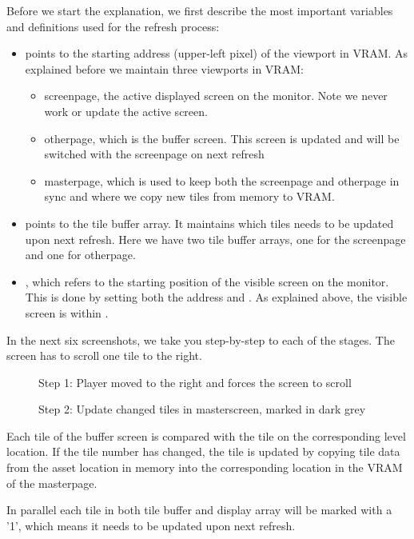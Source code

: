 \documentclass[book.tex]{subfiles}
\begin{document}
Before we start the explanation, we first describe the most important variables and definitions used for the refresh process:
\begin{itemize}
  \item {} points to the starting address (upper-left pixel) of the viewport in VRAM. As explained before we maintain three viewports in VRAM:
  \begin{itemize}
    \item screenpage, the active displayed screen on the monitor. Note we never work or update the active screen.
    \item otherpage, which is the buffer screen. This screen is updated and will be switched with the screenpage on next refresh
    \item masterpage, which is used to keep both the screenpage and otherpage in sync and where we copy new tiles from memory to VRAM.
  \end{itemize}
  \item {} points to the tile buffer array. It maintains which tiles needs to be updated upon next refresh. Here we have two tile buffer arrays, one for the screenpage and one for otherpage.
  \item {}, which refers to the starting position of the visible screen on the monitor. This is done by setting both the  address and . As explained above, the visible screen is within . 
\end{itemize}

In the next six screenshots, we take you step-by-step to each of the stages. The screen has to scroll one tile to the right. \\

\begin{figure}[H]
\centering
 \caption{Step 1: Player moved to the right and forces the screen to scroll}
 \label{fig:kc1_3_start}
\end{figure}

\begin{figure}[H]
\centering
 \caption{Step 2: Update changed tiles in masterscreen, marked in dark grey}
 \label{fig:kc1_3_update_masterscreen}
\end{figure}

Each tile of the buffer screen is compared with the tile on the corresponding level location. If the tile number has changed, the tile is updated by copying tile data from the asset location in memory into the corresponding location in the VRAM of the masterpage.\\
\par
In parallel each tile in both tile buffer and display array will be marked with a '1', which means it needs to be updated upon next refresh.
\end{document}
